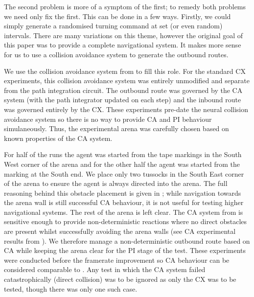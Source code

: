 \documentclass[a4paper,11pt,twoside,openright]{article}
\begin{document}
The second problem is more of a symptom of the first; to remedy both problems we
need only fix the first. This can be done in a few ways. Firstly, we could
simply generate a randomised turning command at set (or even random) intervals.
There are many variations on this theme, however the original goal of this paper
was to provide a complete navigational system. It makes more sense for us to use
a collision avoidance system to generate the outbound routes.
\newline\par

We use the collision avoidance system from \cite{Mitchell2018} to fill this
role. For the standard CX experiments, this collision avoidance system was
entirely unmodified and separate from the path integration circuit. The outbound
route was governed by the CA system (with the path integrator updated on each
step) and the inbound route was governed entirely by the CX. These experiments
pre-date the neural collision avoidance system so there is no way to provide
CA and PI behaviour simulaneously. Thus, the experimental arena was carefully
chosen based on known properties of the CA system.
\newline
\par

For half of the runs the agent was started from the tape markings in
the South West corner of the arena and for the other half the agent
was started from the marking at the South end.  We place only two
tussocks in the South East corner of the arena to ensure the agent is
always directed into the arena. The full reasoning behind this
obstacle placement is given in \cite{Mitchell2018}; while navigation
towards the arena wall is still successful CA behaviour, it is not
useful for testing higher navigational systems. The rest of the arena
is left clear. The CA system from \cite{Mitchell2018} is sensitive
enough to provide non-deterministic reactions where no direct
obstacles are present whilst successfully avoiding the arena walls
(see CA experimental results from \cite{Mitchell2018}). We therefore
manage a non-deterministic outbound route based on CA while keeping
the arena clear for the PI stage of the test. These experiments were
conducted before the framerate improvement so CA behaviour can be
considered comparable to \cite{Mitchell2018}. Any test in which the CA
system failed catastrophically (direct collision) was to be ignored as
only the CX was to be tested, though there was only one such case.
\newline\par
\end{document}
